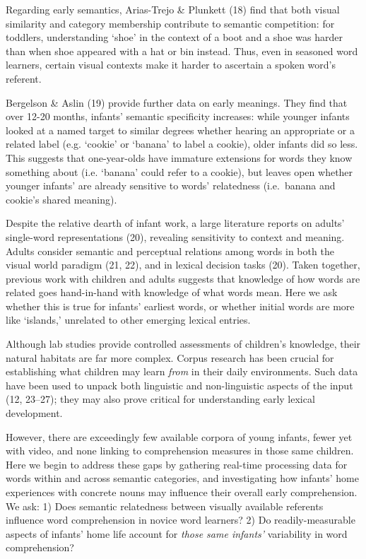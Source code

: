 \documentclass[9pt,twocolumn,twoside,]{pnas-new}
\begin{document}
Regarding early semantics, Arias-Trejo \& Plunkett (18) find that both
visual similarity and category membership contribute to semantic
competition: for toddlers, understanding `shoe' in the context of a boot
and a shoe was harder than when shoe appeared with a hat or bin instead.
Thus, even in seasoned word learners, certain visual contexts make it
harder to ascertain a spoken word's referent.

Bergelson \& Aslin (19) provide further data on early meanings. They
find that over 12-20 months, infants' semantic specificity increases:
while younger infants looked at a named target to similar degrees
whether hearing an appropriate or a related label (e.g. `cookie' or
`banana' to label a cookie), older infants did so less. This suggests
that one-year-olds have immature extensions for words they know
something about (i.e. `banana' could refer to a cookie), but leaves open
whether younger infants' are already sensitive to words' relatedness
(i.e.~banana and cookie's shared meaning).

Despite the relative dearth of infant work, a large literature reports
on adults' single-word representations (20), revealing sensitivity to
context and meaning. Adults consider semantic and perceptual relations
among words in both the visual world paradigm (21, 22), and in lexical
decision tasks (20). Taken together, previous work with children and
adults suggests that knowledge of how words are related goes
hand-in-hand with knowledge of what words mean. Here we ask whether this
is true for infants' earliest words, or whether initial words are more
like `islands,' unrelated to other emerging lexical entries.

Although lab studies provide controlled assessments of children's
knowledge, their natural habitats are far more complex. Corpus research
has been crucial for establishing what children may learn \emph{from} in
their daily environments. Such data have been used to unpack both
linguistic and non-linguistic aspects of the input (12, 23--27); they
may also prove critical for understanding early lexical development.

However, there are exceedingly few available corpora of young infants,
fewer yet with video, and none linking to comprehension measures in
those same children. Here we begin to address these gaps by gathering
real-time processing data for words within and across semantic
categories, and investigating how infants' home experiences with
concrete nouns may influence their overall early comprehension. We ask:
1) Does semantic relatedness between visually available referents
influence word comprehension in novice word learners? 2) Do
readily-measurable aspects of infants' home life account for \emph{those
same infants'} variability in word comprehension?
\end{document}
